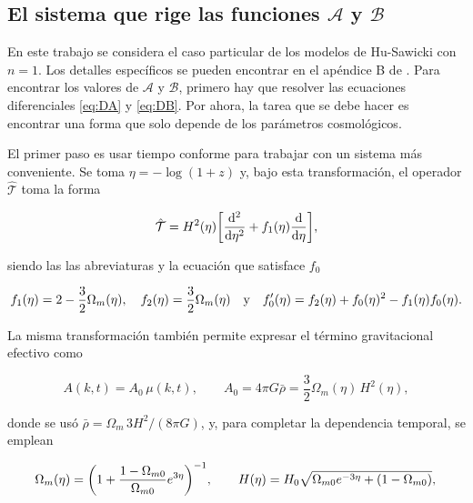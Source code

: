 \documentclass[letterpaper, 12pt]{article}
\begin{document}
        \subsection{\texorpdfstring{El sistema que rige las funciones $\mathcal{A}$ y $\mathcal{B}$}{El sistema que rige las funciones A y B}} 

        En este trabajo se considera el caso particular de los modelos de Hu-Sawicki con $n = 1$. Los detalles específicos se pueden encontrar en el apéndice B de \cite{1}. Para encontrar los valores de $\mathcal{A}$ y $\mathcal{B}$, primero hay que resolver las ecuaciones diferenciales \ref{eq:DA} y \ref{eq:DB}. Por ahora, la tarea que se debe hacer es encontrar una forma que solo depende de los parámetros cosmológicos.

        El primer paso es usar tiempo conforme para trabajar con un sistema más conveniente. Se toma $\eta = -\log(1 + z)$ y, bajo esta transformación, el operador $\hat{\mathcal{T}}$ toma la forma
        
        \begin{equation}\label{eq:operador_conforme}
            \hat{\mathcal{T}} = H^2(\eta)\qty[\dv[2]{}{\eta} + f_1(\eta)\dv{}{\eta}],
        \end{equation}
        
        siendo las las abreviaturas y la ecuación que satisface $f_0$
        
        \begin{equation}
            f_1(\eta) = 2 - \frac32\Omega_m(\eta) \qc f_2(\eta) = \frac32\Omega_m(\eta) \qq{y} f_0^{\prime}(\eta) = f_2(\eta) + f_0(\eta)^2 - f_1(\eta)f_0(\eta).
        \end{equation}
        
        La misma transformación también permite expresar el término gravitacional efectivo como
        
        \begin{equation}\label{eq:termino_A}
            A(k,t) = A_0\,\mu(k,t), \qquad A_0=4\pi G\bar\rho=\frac{3}{2}\Omega_m(\eta)\,H^2(\eta),
        \end{equation}
        
        donde se usó $\bar\rho=\Omega_m\,3H^2/(8\pi G)$, y, para completar la dependencia temporal, se emplean
        
        \begin{equation}
            \Omega_m(\eta) = \qty(1+\frac{1-\Omega_{m0}}{\Omega_{m0}}e^{3\eta})^{-1}, \qq{}
            H(\eta) = H_0\sqrt{\Omega_{m0} e^{-3\eta}+(1-\Omega_{m0})}, \\
        \end{equation}
        
\end{document}
